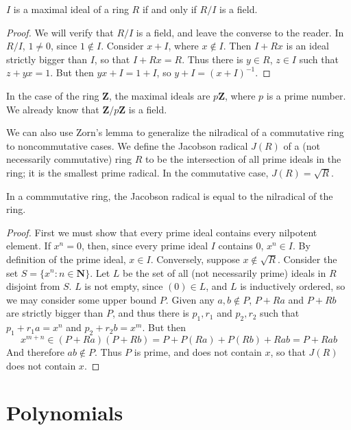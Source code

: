 \begin{theorem}
    $I$ is a maximal ideal of a ring $R$ if and only if $R/I$ is a field.
\end{theorem}
\begin{proof}
    We will verify that $R/I$ is a field, and leave the converse to the reader. In $R/I$, $1 \neq 0$, since $1 \not\in I$. Consider $x + I$, where $x \not\in I$. Then $I + Rx$ is an ideal strictly bigger than $I$, so that $I + Rx = R$. Thus there is $y \in R$, $z \in I$ such that $z + yx = 1$. But then $yx + I = 1 + I$, so $y + I = (x + I)^{-1}$.
\end{proof}

In the case of the ring $\mathbf{Z}$, the maximal ideals are $p\mathbf{Z}$, where $p$ is a prime number. We already know that $\mathbf{Z}/p\mathbf{Z}$ is a field.

We can also use Zorn's lemma to generalize the nilradical of a commutative ring to noncommutative cases. We define the Jacobson radical $J(R)$ of a (not necessarily commutative) ring $R$ to be the intersection of all prime ideals in the ring; it is the smallest prime radical. In the commutative case, $J(R) = \sqrt{R}$.

\begin{theorem}
    In a commmutative ring, the Jacobson radical is equal to the nilradical of the ring.
\end{theorem}
\begin{proof}
    First we must show that every prime ideal contains every nilpotent element. If $x^n = 0$, then, since every prime ideal $I$ contains $0$, $x^n \in I$. By definition of the prime ideal, $x \in I$. Conversely, suppose $x \not\in \sqrt{R}$. Consider the set $S = \{ x^n : n \in \mathbf{N} \}$. Let $L$ be the set of all (not necessarily prime) ideals in $R$ disjoint from $S$. $L$ is not empty, since $(0) \in L$, and $L$ is inductively ordered, so we may consider some upper bound $P$. Given any $a,b \not\in P$, $P + Ra$ and $P + Rb$ are strictly bigger than $P$, and thus there is $p_1,r_1$ and $p_2,r_2$ such that $p_1 + r_1a = x^n$ and $p_2 + r_2b = x^m$. But then
    \[ x^{m + n} \in (P + Ra)(P + Rb) = P + P(Ra) + P(Rb) + Rab = P + Rab \]
    And therefore $ab \notin P$. Thus $P$ is prime, and does not contain $x$, so that $J(R)$ does not contain $x$.
\end{proof}



\chapter{Polynomials}

